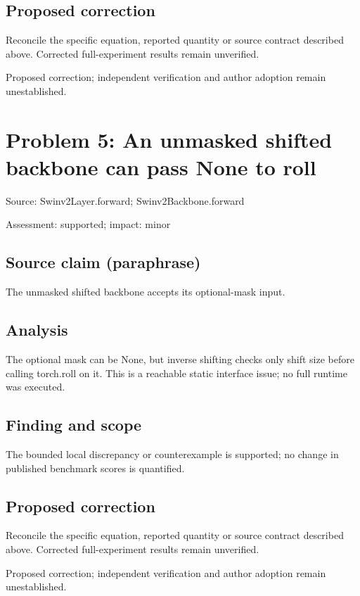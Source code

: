 \documentclass[11pt]{article}
\begin{document}
\subsection*{Proposed correction}

Reconcile the specific equation, reported quantity or source contract described above. Corrected full-experiment results remain unverified.

Proposed correction; independent verification and author adoption remain unestablished.

\section*{Problem 5: An unmasked shifted backbone can pass None to roll}

Source: Swinv2Layer.forward; Swinv2Backbone.forward

Assessment: supported; impact: minor

\subsection*{Source claim (paraphrase)}

The unmasked shifted backbone accepts its optional-mask input.

\subsection*{Analysis}

The optional mask can be None, but inverse shifting checks only shift size before calling torch.roll on it. This is a reachable static interface issue; no full runtime was executed.

\subsection*{Finding and scope}

The bounded local discrepancy or counterexample is supported; no change in published benchmark scores is quantified.

\subsection*{Proposed correction}

Reconcile the specific equation, reported quantity or source contract described above. Corrected full-experiment results remain unverified.

Proposed correction; independent verification and author adoption remain unestablished.
\end{document}
